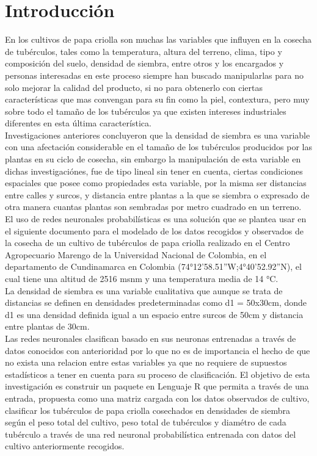 

\chapter*{Introducci\'on}

En los cultivos de papa criolla son muchas las variables que influyen en la cosecha de tub\'erculos, tales como la temperatura, altura del terreno, clima, tipo y composici\'on del suelo, densidad de siembra, entre otros y los encargados y personas interesadas en este proceso siempre han buscado manipularlas para no solo mejorar la calidad del producto, si no para obtenerlo con ciertas caracter\'isticas que mas convengan para su fin como la piel, contextura, pero muy sobre todo el tama\~no de los tub\'erculos ya que existen intereses industriales diferentes en esta \'ultima caracter\'istica.\\

Investigaciones anteriores concluyeron que la densidad de siembra es una variable con una afectaci\'on considerable en el tama\~no de los tub\'erculos producidos por las plantas en su ciclo de cosecha, sin embargo la manipulaci\'on de esta variable en dichas investigaci\'ones, fue de tipo lineal sin tener en cuenta, ciertas condiciones espaciales que posee como propiedades esta variable, por la misma ser distancias entre calles y surcos, y distancia entre plantas a la que se siembra o expresado de otra manera cuantas plantas son sembradas por metro cuadrado en un terreno.\\

El uso de redes neuronales probabil\'isticas es una soluci\'on que se plantea usar en el siguiente documento para el modelado de los datos recogidos y observados de la cosecha de un cultivo de tub\'erculos de papa criolla realizado en el Centro Agropecuario Marengo de la Universidad Nacional de Colombia, en el departamento de Cundinamarca en Colombia (74°12'58.51''W;4°40'52.92''N), el cual tiene una altitud de 2516 msnm y una temperatura media de 14 °C.\\

La densidad de siembra es una variable cualitativa que aunque se trata de distancias se definen en densidades predeterminadas como d1 = 50x30cm, donde d1 es una densidad definida igual a un espacio entre surcos de 50cm y distancia entre plantas de 30cm.\\ 

Las redes neuronales clasifican basado en sus neuronas entrenadas a trav\'es de datos conocidos con anterioridad por lo que no es de importancia el hecho de que no exista una relacion entre estas variables ya que no requiere de supuestos estad\'isticos a tener en cuenta para su proceso de clasificaci\'on. El objetivo de esta investigaci\'on es construir un paquete en Lenguaje R que permita a trav\'es de una entrada, propuesta como una matriz cargada con los datos observados de cultivo, clasificar los tub\'erculos de papa criolla cosechados en densidades de siembra seg\'un el peso total del cultivo, peso total de tub\'erculos y diam\'etro de cada tub\'erculo a trav\'es de una red neuronal probabil\'istica entrenada con datos del cultivo anteriormente recogidos.\\